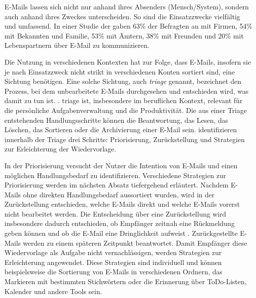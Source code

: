 E-Mails lassen sich nicht nur anhand ihres Absenders (Mensch/System), sondern auch anhand ihres Zweckes unterscheiden. So sind die Einsatzzwecke vielfältig und umfassend. In einer Studie der \cite{MMG2020} gaben 63\% der Befragten an mit Firmen, 54\% mit Bekannten und Familie, 53\% mit Ämtern, 38\% mit Freunden und 20\% mit Lebenspartnern über E-Mail zu kommunizieren.

Die Nutzung in verschiedenen Kontexten hat zur Folge, dass E-Mails, insofern sie je nach Einsatzzweck nicht strikt in verschiedenen Konten sortiert sind, eine Sichtung benötigen. Eine solche Sichtung, auch \emph{\gls{triage}} genannt, bezeichnet den \glqq[...] Prozess, bei dem unbearbeitete E-Mails durchgesehen und entschieden wird, was damit zu tun ist.\grqq{} \citep[S. 325]{Sarrafzadeh2019}. \gls{triage} ist, insbesondere im beruflichen Kontext, relevant für die persönliche Aufgabenverwaltung und die Produktivität. Die aus einer Triage entstehenden Handlungsschritte können die Beantwortung, das Lesen, das Löschen, das Sortieren oder die Archivierung einer E-Mail sein. \cite{Sarrafzadeh2019} identifizieren innerhalb der Triage drei Schritte: Priorisierung, Zurückstellung und Strategien zur Erleichterung der Wiedervorlage.

In der Priorisierung versucht der Nutzer die Intention von E-Mails und einen möglichen Handlungsbedarf zu identifizieren. Verschiedene Strategien zur Priorisierung werden im nächsten Absatz tiefergehend erläutert. Nachdem E-Mails ohne direkten Handlungsbedarf aussortiert wurden, wird in der Zurückstellung entschieden, welche E-Mails direkt und welche E-Mails vorerst nicht bearbeitet werden. Die Entscheidung über eine Zurückstellung wird insbesondere dadurch entschieden, ob Empfänger zeitnah eine Rückmeldung geben können und ob die E-Mail eine Dringlichkeit aufweist \citep[S. 327]{Sarrafzadeh2019}. Zurückgestellte E-Mails werden zu einem späteren Zeitpunkt beantwortet. Damit Empfänger diese Wiedervorlage als Aufgabe nicht vernachlässigen, werden Strategien zur Erleichterung angewendet. Diese Strategien sind individuell und können beispielsweise die Sortierung von E-Mails in verschiedenen Ordnern, das Markieren mit bestimmten Stichwörtern oder die Erinnerung über ToDo-Listen, Kalender und andere Tools sein.


